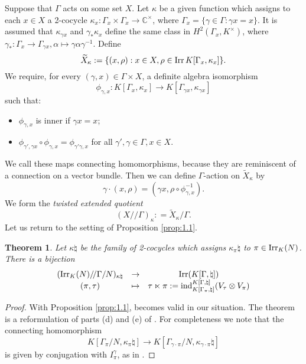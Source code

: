 \documentclass[11pt]{amsart}
\newtheorem{thm}{Theorem}[section]
\theoremstyle{definition}
\newcommand{\C}{\mathbb C}
\newcommand{\q}{/\!/}
\def\Irr{{\rm Irr}}
\def\ind{{\rm ind}}
\begin{document}
Suppose that $\Gamma$ acts on some set $X$.
Let $\kappa$ be a given function which assigns to each 
$x \in X$ a 2-cocycle $\kappa_x : \Gamma_x \times \Gamma_x \to \C^\times$,
where $\Gamma_x = \{\gamma \in \Gamma : \gamma x = x\}$.   
It is assumed that $\kappa_{\gamma x}$ and $\gamma_* \kappa_x$ define the same
class in $H^2 (\Gamma_x , K^\times)$, where $\gamma_* : \Gamma_x \to \Gamma_{\gamma x}, 
\alpha \mapsto \gamma \alpha \gamma^{-1}$. Define 
\[
\widetilde X_\kappa : = \{(x,\rho) : x \in X, \rho \in \Irr \, K[\Gamma_x, \kappa_x] \}.
\]
We require, for every $(\gamma,x) \in \Gamma \times X$, a definite  algebra isomorphism
\begin{equation}\label{eq:can}
\phi_{\gamma,x} : K [\Gamma_x,\kappa_x] \to K [\Gamma_{\gamma x},\kappa_{\gamma x}]
\end{equation}
such that:
\begin{itemize}
\item $\phi_{\gamma,x}$ is inner if $\gamma x = x$;
\item $\phi_{\gamma',\gamma x} \circ \phi_{\gamma,x} = 
\phi_{\gamma' \gamma,x}$ for all $\gamma',\gamma \in \Gamma, x \in X$.
\end{itemize}
We call these maps connecting homomorphisms, because they are reminiscent 
of a connection on a vector bundle.
Then we can define $\Gamma$-action on $\widetilde X_\kappa$ by
\[
\gamma \cdot (x,\rho) = (\gamma x, \rho \circ \phi_{\gamma,x}^{-1}).
\]
We form the \emph{twisted extended quotient}
\begin{equation}\label{eq:extquot}
(X\q \Gamma)_\kappa : = \widetilde{X}_\kappa / \Gamma.
\end{equation}
Let us return to the setting of Proposition \ref{prop:1.1}.

\begin{thm}\label{thm:1.2}
Let $\kappa \natural$ be the family of 2-cocycles which assigns $\kappa_\pi \natural$
to $\pi \in \Irr_K (N)$. There is a bijection
\[
\begin{array}{ccc}
( \Irr_K (N) \q \Gamma / N )_{\kappa \natural} & \to & \Irr (K [\Gamma,\natural]) \\
(\pi,\tau) & \mapsto & \tau \ltimes \pi := 
\ind_{K[\Gamma_\pi,\natural]}^{K[\Gamma,\natural]} (V_\tau \otimes V_\pi) 
\end{array}
\]
\end{thm}
\begin{proof}
With Proposition \ref{prop:1.1}, \cite[Appendix]{SolGHA} becomes valid in our situation.
The theorem is a reformulation of parts (d) and (e) of \cite[Theorem 11.2]{SolGHA}.
For completeness we note that the connecting homomorphism
\[
K [ \Gamma_\pi / N ,\kappa_\pi \natural] \to K [\Gamma_{\gamma \cdot \pi} / N,
\kappa_{\gamma \cdot \pi} \natural ]
\]
is given by conjugation with $I^\gamma_\pi$, as in \cite[(3)]{ABPS5}.
\end{proof}
\end{document}
